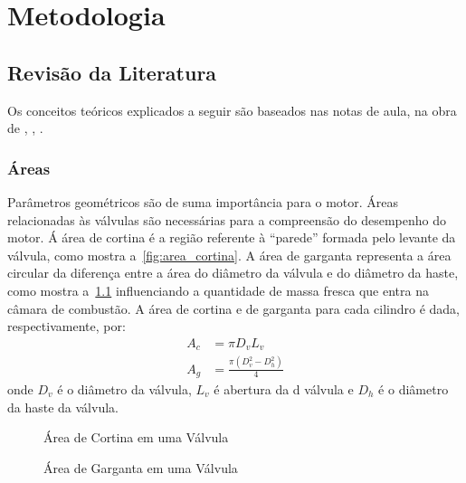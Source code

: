 \chapter{Metodologia}

\section{Revisão da Literatura}

Os conceitos teóricos explicados a seguir são baseados nas notas de aula, na obra de \textcite{heywood2018internal}, \textcite{blair1999design}, \textcite{ferguson2015internal}.

\subsection{Áreas}

Parâmetros geométricos são de suma importância para o motor. 
Áreas relacionadas às válvulas são necessárias para a compreensão do desempenho do motor.
Á área de cortina é a região referente à ``parede'' formada pelo levante da válvula, como mostra a~\cref{fig:area_cortina}.
A área de garganta representa a área circular da diferença entre a área do diâmetro da válvula e do diâmetro da haste, como mostra a~\cref{fig:area_garganta} influenciando a quantidade de massa fresca que entra na câmara de combustão.
A área de cortina e de garganta para cada cilindro é dada, respectivamente, por: 
%
\begin{align}
    A_c &= \pi D_v L_v
    \label{eq:area_cortina} \\
    A_g &= \frac{\pi \left(D^2_v - D^2_h\right)}{4} 
    \label{eq:area_garganta}
\end{align}
%
onde $D_v$ é o diâmetro da válvula, $L_v$ é abertura da d válvula e $D_h$ é o diâmetro da haste da válvula. 
%
\begin{figure}[!htb]
    \centering
    \begin{minipage}{0.49\textwidth}
        \centering
        \caption{Área de Cortina em uma Válvula}
        
        \label{fig:area_cortina}
    \end{minipage}
    \hfill
    \begin{minipage}{0.49\textwidth}
        \centering
        \caption{Área de Garganta em uma Válvula}
        
        \label{fig:area_garganta}
    \end{minipage}
\end{figure}
%
